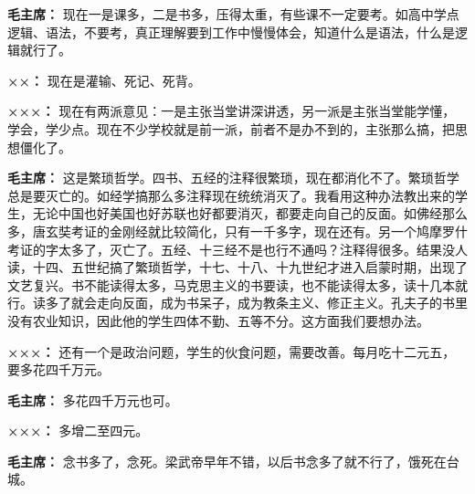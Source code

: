 \begin{duihua}
\item[\textbf{毛主席：}] 现在一是课多，二是书多，压得太重，有些课不一定要考。如高中学点逻辑、语法，不要考，真正理解要到工作中慢慢体会，知道什么是语法，什么是逻辑就行了。

\item[\textbf{××：}] 现在是灌输、死记、死背。

\item[\textbf{×××：}] 现在有两派意见：一是主张当堂讲深讲透，另一派是主张当堂能学懂，学会，学少点。现在不少学校就是前一派，前者不是办不到的，主张那么搞，把思想僵化了。

\item[\textbf{毛主席：}] 这是繁琐哲学。四书、五经的注释很繁琐，现在都消化不了。繁琐哲学总是要灭亡的。如经学搞那么多注释现在统统消灭了。我看用这种办法教出来的学生，无论中国也好美国也好苏联也好都要消灭，都要走向自己的反面。如佛经那么多，唐玄奘考证的金刚经就比较简化，只有一千多字，现在还有。另一个鸠摩罗什考证的字太多了，灭亡了。五经、十三经不是也行不通吗？注释得很多。结果没人读，十四、五世纪搞了繁琐哲学，十七、十八、十九世纪才进入启蒙时期，出现了文艺复兴。书不能读得太多，马克思主义的书要读，也不能读得太多，读十几本就行。读多了就会走向反面，成为书呆子，成为教条主义、修正主义。孔夫子的书里没有农业知识，因此他的学生四体不勤、五等不分。这方面我们要想办法。

\item[\textbf{×××：}] 还有一个是政治问题，学生的伙食问题，需要改善。每月吃十二元五，要多花四千万元。

\item[\textbf{毛主席：}] 多花四千万元也可。

\item[\textbf{×××：}] 多增二至四元。

\item[\textbf{毛主席：}] 念书多了，念死。梁武帝早年不错，以后书念多了就不行了，饿死在台城。
\end{duihua}

